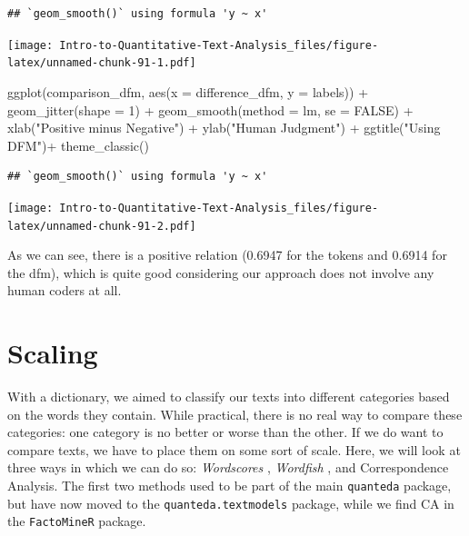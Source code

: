 \documentclass[
]{article}
\newenvironment{Shaded}{\begin{snugshade}}{\end{snugshade}}
\newcommand{\AttributeTok}[1]{\textcolor[rgb]{0.77,0.63,0.00}{#1}}
\newcommand{\ConstantTok}[1]{\textcolor[rgb]{0.00,0.00,0.00}{#1}}
\newcommand{\DecValTok}[1]{\textcolor[rgb]{0.00,0.00,0.81}{#1}}
\newcommand{\FunctionTok}[1]{\textcolor[rgb]{0.00,0.00,0.00}{#1}}
\newcommand{\NormalTok}[1]{#1}
\newcommand{\SpecialCharTok}[1]{\textcolor[rgb]{0.00,0.00,0.00}{#1}}
\newcommand{\StringTok}[1]{\textcolor[rgb]{0.31,0.60,0.02}{#1}}
\begin{document}
\begin{verbatim}
## `geom_smooth()` using formula 'y ~ x'
\end{verbatim}

\texttt{[image: Intro-to-Quantitative-Text-Analysis\_files/figure-latex/unnamed-chunk-91-1.pdf]}

\begin{Shaded}
\begin{Highlighting}[]
\FunctionTok{ggplot}\NormalTok{(comparison\_dfm, }\FunctionTok{aes}\NormalTok{(}\AttributeTok{x =}\NormalTok{ difference\_dfm, }\AttributeTok{y =}\NormalTok{ labels)) }\SpecialCharTok{+}
 \FunctionTok{geom\_jitter}\NormalTok{(}\AttributeTok{shape =} \DecValTok{1}\NormalTok{) }\SpecialCharTok{+}
 \FunctionTok{geom\_smooth}\NormalTok{(}\AttributeTok{method =}\NormalTok{ lm, }\AttributeTok{se =} \ConstantTok{FALSE}\NormalTok{) }\SpecialCharTok{+}
 \FunctionTok{xlab}\NormalTok{(}\StringTok{"Positive minus Negative"}\NormalTok{) }\SpecialCharTok{+}
 \FunctionTok{ylab}\NormalTok{(}\StringTok{"Human Judgment"}\NormalTok{) }\SpecialCharTok{+}
 \FunctionTok{ggtitle}\NormalTok{(}\StringTok{"Using DFM"}\NormalTok{)}\SpecialCharTok{+}
 \FunctionTok{theme\_classic}\NormalTok{()}
\end{Highlighting}
\end{Shaded}

\begin{verbatim}
## `geom_smooth()` using formula 'y ~ x'
\end{verbatim}

\texttt{[image: Intro-to-Quantitative-Text-Analysis\_files/figure-latex/unnamed-chunk-91-2.pdf]}

As we can see, there is a positive relation (0.6947 for the tokens and 0.6914 for the dfm), which is quite good considering our approach does not involve any human coders at all.

\hypertarget{scaling}{%
\section{Scaling}\label{scaling}}

With a dictionary, we aimed to classify our texts into different categories based on the words they contain. While practical, there is no real way to compare these categories: one category is no better or worse than the other. If we do want to compare texts, we have to place them on some sort of scale. Here, we will look at three ways in which we can do so: \emph{Wordscores} \autocite{Laver2003a}, \emph{Wordfish} \autocite{Slapin2008a}, and Correspondence Analysis. The first two methods used to be part of the main \texttt{quanteda} package, but have now moved to the \texttt{quanteda.textmodels} package, while we find CA in the \texttt{FactoMineR} package.
\end{document}
